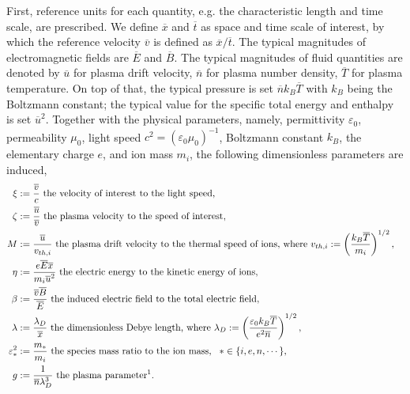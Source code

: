 \documentclass{article}
\begin{document}
First, reference units for each quantity, e.g. the characteristic length and time scale, are prescribed. We define $\overline{x}$ and $\overline{t}$ as space and time scale of interest, by which the reference velocity $\overline{v}$ is defined as $\overline{x}/\overline{t}$. The typical magnitudes of electromagnetic fields are $\overline{E}$ and $\overline{B}$. The typical magnitudes of fluid quantities are denoted by $\overline{u}$ for plasma drift velocity, $\overline{n}$ for plasma number density, $\overline{T}$ for plasma temperature. On top of that, the typical pressure is set $\overline{n}k_B\overline{T}$ with $k_B$ being the Boltzmann constant; the typical value for the specific total energy and enthalpy is set $\overline{u}^2$. Together with the physical parameters, namely, permittivity $\varepsilon_0$, permeability $\mu_0$, light speed $c^2 = (\varepsilon_0\mu_0)^{-1}$, Boltzmann constant $k_B$, the elementary charge $e$, and ion mass $m_i$, the following dimensionless parameters are induced,
\begin{align*} 
    \xi &:= \frac{\overline{v}}{c} \text{ the velocity of interest to the light speed}, &\\
    \zeta &:= \frac{\overline{u}}{\overline{v}} \text{ the plasma velocity to the speed of interest}, &\\
    M &:= \frac{\overline{u}}{v_{th,i}} \text{ the plasma drift velocity to the thermal speed of ions, where } v_{th,i} := \left(\frac{k_B \overline{T}}{m_i}\right)^{1/2}, &\\
    \eta &:= \frac{e\overline{E}\overline{x}}{m_i\overline{u}^2} \text{ the electric energy to the kinetic energy of ions}, &\\
    \beta &:= \frac{\overline{v}\overline{B}}{\overline{E}} \text{ the induced electric field to the total electric field}, &\\
    \lambda &:= \frac{\lambda_D}{\overline{x}} \text{ the dimensionless Debye length, where }\lambda_D := \left(\frac{\varepsilon_0k_B\overline{T}}{e^2\overline{n}}\right)^{1/2}, &\\
    \varepsilon_*^2 &:= \frac{m_*}{m_i} \text{ the species mass ratio to the ion mass},\ \  * \in \{i,e,n,\cdots\}, &\\
    g &:= \frac{1}{\overline{n}\lambda_D^3} \text{ the plasma parameter\footnotemark}.&
\end{align*}
\end{document}
